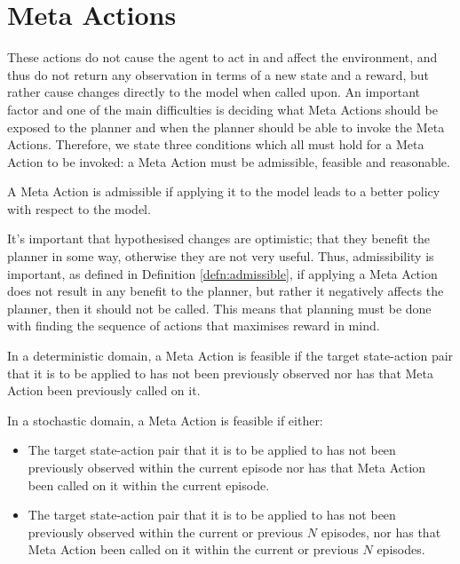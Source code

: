 \section{Meta Actions}
\label{sec:31}
These actions do not cause the agent to act in and affect the environment, and thus do not return any observation in terms of a new state and a reward, but rather cause changes directly to the model when called upon. An important factor and one of the main difficulties is deciding what Meta Actions should be exposed to the planner and when the planner should be able to invoke the Meta Actions. Therefore, we state three conditions which all must hold for a Meta Action to be invoked: a Meta Action must be admissible, feasible and reasonable.

\begin{defn}
\label{defn:admissible}
    A Meta Action is admissible if applying it to the model leads to a better policy with respect to the model.
\end{defn}
It's important that hypothesised changes are optimistic; that they benefit the planner in some way, otherwise they are not very useful. Thus, admissibility is important, as defined in Definition \ref{defn:admissible}, if applying a Meta Action does not result in any benefit to the planner, but rather it negatively affects the planner, then it should not be called. This means that planning must be done with finding the sequence of actions that maximises reward in mind.
\begin{defn}
\label{defn:feasible_deterministic}
In a deterministic domain, a Meta Action is feasible if the target state-action pair that it is to be applied to has not been previously observed nor has that Meta Action been previously called on it.
\end{defn}
\begin{defn}
\label{defn:feasible_stochastic}
In a stochastic domain, a Meta Action is feasible if either:
\begin{itemize}
    \item The target state-action pair that it is to be applied to has not been previously observed within the current episode nor has that Meta Action been called on it within the current episode.
    \item The target state-action pair that it is to be applied to has not been previously observed within the current or previous $N$ episodes, nor has that Meta Action been called on it within the current or previous $N$ episodes.
\end{itemize}
\end{defn}
